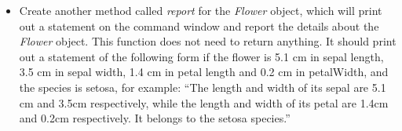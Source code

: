 \documentclass{article}
\begin{document}
\begin{enumerate}
\begin{itemize}
		\item  Create another method called \textit{report} for the \textit{Flower} object, which will print out a statement on the command window and report the details about the \textit{Flower} object. This function does not need to return anything. It should print out a statement of the following form if the flower is 5.1 cm in sepal length, 3.5 cm in sepal width, 1.4 cm in petal length and 0.2 cm in petalWidth, and the species is setosa, for example: “The length and width of its sepal are 5.1 cm and 3.5cm respectively, while the length and width of its petal are 1.4cm and 0.2cm respectively. It belongs to the setosa species.”

	\end{itemize}
\end{enumerate}
\end{document}
